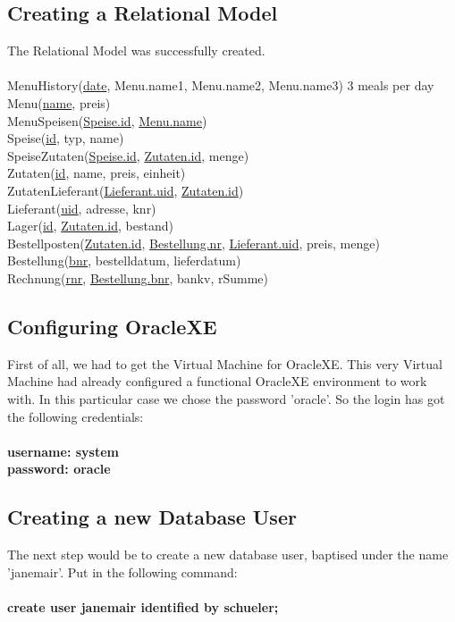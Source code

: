 \documentclass[11pt,a4paper]{article}
\begin{document}
\subsection{Creating a Relational Model}
The Relational Model was successfully created. \\ \\ MenuHistory(\underline{date}, Menu.name1, Menu.name2, Menu.name3) 3 meals per day \\
Menu(\underline{name}, preis) \\
MenuSpeisen(\underline{Speise.id}, \underline{Menu.name}) \\
Speise(\underline{id}, typ, name) \\
SpeiseZutaten(\underline{Speise.id}, \underline{Zutaten.id}, menge) \\
Zutaten(\underline{id}, name, preis, einheit) \\
ZutatenLieferant(\underline{Lieferant.uid}, \underline{Zutaten.id}) \\
Lieferant(\underline{uid}, adresse, knr) \\
Lager(\underline{id}, \underline{Zutaten.id}, bestand) \\
Bestellposten(\underline{Zutaten.id}, \underline{Bestellung.nr}, \underline{Lieferant.uid}, preis, menge) \\
Bestellung(\underline{bnr}, bestelldatum, lieferdatum) \\
Rechnung(\underline{rnr}, \underline{Bestellung.bnr}, bankv, rSumme) \\
\newpage
\subsection{Configuring OracleXE}
First of all, we had to get the Virtual Machine for OracleXE. This very Virtual Machine had already configured a functional OracleXE environment to work with. In this particular case we chose the password 'oracle'. So the login has got the following credentials: \\ \\ \textbf{username: system} \\ \textbf{password: oracle}
\subsection{Creating a new Database User}
The next step would be to create a new database user, baptised under the name 'janemair'. Put in the following command: \\ \\ \textbf{create user janemair identified by schueler;}
\end{document}
